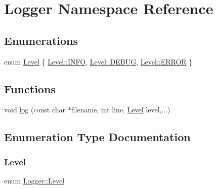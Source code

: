 \hypertarget{namespaceLogger}{}\section{Logger Namespace Reference}
\label{namespaceLogger}
\subsection*{Enumerations}
\begin{DoxyCompactItemize}
\item 
enum \hyperlink{namespaceLogger_ad766a24576ea8b27ad9d5649cef46d8f}{Level} \{ \hyperlink{namespaceLogger_ad766a24576ea8b27ad9d5649cef46d8fa551b723eafd6a31d444fcb2f5920fbd3}{Level\+::\+I\+N\+FO}, 
\hyperlink{namespaceLogger_ad766a24576ea8b27ad9d5649cef46d8fadc30ec20708ef7b0f641ef78b7880a15}{Level\+::\+D\+E\+B\+UG}, 
\hyperlink{namespaceLogger_ad766a24576ea8b27ad9d5649cef46d8fabb1ca97ec761fc37101737ba0aa2e7c5}{Level\+::\+E\+R\+R\+OR}
 \}
\end{DoxyCompactItemize}
\subsection*{Functions}
\begin{DoxyCompactItemize}
\item 
void \hyperlink{namespaceLogger_a188a368bf6e884b7eba1236c39130364}{log} (const char $\ast$filename, int line, \hyperlink{namespaceLogger_ad766a24576ea8b27ad9d5649cef46d8f}{Level} level,...)
\end{DoxyCompactItemize}


\subsection{Enumeration Type Documentation}
\mbox{\label{namespaceLogger_ad766a24576ea8b27ad9d5649cef46d8f}} 
\subsubsection{\texorpdfstring{Level}{Level}}
{\footnotesize\ttfamily enum \hyperlink{namespaceLogger_ad766a24576ea8b27ad9d5649cef46d8f}{Logger\+::\+Level}\hspace{0.3cm}{\ttfamily [strong]}}

